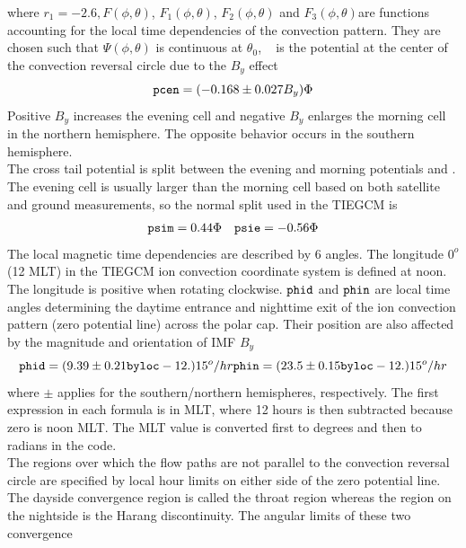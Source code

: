% 
where $r_1 = -2.6, F(\phi,\theta) $,  $F_1(\phi,\theta) $, $F_2(\phi,\theta)$  and  
 $F_3(\phi,\theta)$are functions accounting for the local time 
dependencies of the convection pattern. They are chosen such 
that $\Psi(\phi,\theta)$ is continuous at $\theta_0$,  \
 is the potential at the center 
of the convection reversal circle due to the $B_y$ effect
%
\begin{equation}
  \code{pcen} = (-0.168 \pm 0.027 B_y)\Phi
    \label{eq:maginp_8}
\end{equation}
% 
Positive $B_y$ increases the evening cell and
negative $B_y$ enlarges the morning cell in the northern 
hemisphere. The opposite behavior occurs in the 
southern hemisphere. \\
%
The cross tail potential is split between the evening and 
morning potentials  and . The evening cell is usually 
larger than the morning cell based on both satellite and 
ground measurements, so the normal split used in the TIEGCM is
%
\begin{equation}
   \code{psim} = 0.44 \Phi \quad
   \code{psie} =-0.56 \Phi
    \label{eq:maginp_9}
\end{equation}
% 
The local magnetic time dependencies are described 
by 6 angles. The longitude $0^o$ (12 MLT) in the TIEGCM 
ion convection coordinate system is defined at noon. 
The longitude is positive when rotating clockwise.  
$\texttt{phid}$ and $\texttt{phin}$ are local time angles determining the daytime 
entrance and nighttime exit of the ion convection pattern 
(zero potential line) across the polar cap. Their position 
are also affected by the magnitude and orientation of IMF $B_y$
%
\begin{equation}
   \code{phid} = (9.39 \pm 0.21 \code{byloc} - 12.) 15^o/hr
   \code{phin} = (23.5 \pm 0.15 \code{byloc} - 12.) 15^o/hr
    \label{eq:maginp_10}
\end{equation}
% 
where $\pm$ applies for the southern/northern hemispheres, respectively.
The first expression in each formula is in MLT, where 12 hours is then
subtracted because zero is noon MLT.  The MLT value is converted first to degrees
and then to radians in the code. \\
%
The regions over which the flow paths are not parallel to the 
convection reversal circle are specified by local hour limits 
on either side of the zero potential line. The dayside convergence 
region is called the throat region whereas the region on the nightside 
is the Harang discontinuity. The angular limits of these two convergence 
